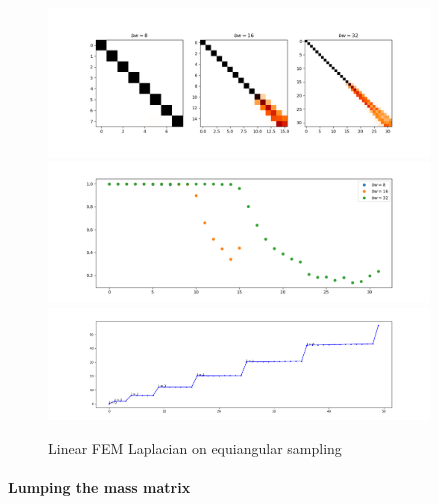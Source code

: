 \begin{figure}[h]
	\label{fig:FEMequiangular}
	\caption{Linear FEM Laplacian on equiangular sampling}
	\centering
	\includegraphics[width=0.9\textwidth]{../codes/03.FEM_laplacian/equiangular/normal/img/linearFEM.png}
	\includegraphics[width=0.9\textwidth]{../codes/03.FEM_laplacian/equiangular/normal/img/linearFEM_diagonal.png}	
	\includegraphics[width=0.9\textwidth]{../codes/03.FEM_laplacian/equiangular/normal/img/FEM_eigenvalues_16.png}	
\end{figure}

\paragraph{Lumping the mass matrix}


